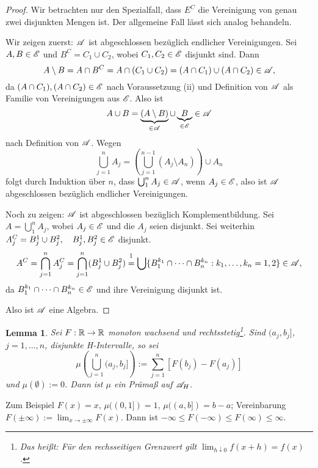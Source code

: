\documentclass[
 a4paper,
 12pt,
 parskip=half
 ]{scrreprt}
\theoremstyle{plain}
\newtheorem{lem}[thm]{Lemma}
\theoremstyle{definition}
\numberwithin{equation}{section}
\begin{document}
\begin{proof}
 Wir betrachten nur den Spezialfall, dass $E^C$ die Vereinigung von genau zwei disjunkten Mengen ist. Der allgemeine Fall lässt sich analog behandeln.
 
 Wir zeigen zuerst: $\mathscr{A}$ ist abgeschlossen bezüglich endlicher Vereinigungen. Sei $A,B \in \mathscr{E}$ und $B^C = C_1 \cup C_2$, wobei $C_1, C_2 \in \mathscr{E}$ disjunkt sind. Dann
 \[ A \setminus B = A \cap B^C = A \cap( C_1 \cup C_2 ) = (A \cap C_1) \cup (A \cap C_2) \in \mathscr{A}, \]
 da $(A \cap C_1), (A \cap C_2) \in \mathscr{E}$ nach Voraussetzung (ii) und Definition von $\mathscr{A}$ als Familie von Vereinigungen aus $\mathscr{E}$. Also ist
 \[ A \cup B = \underbrace{(A \setminus B)}_{\in \mathscr{A}} \cup \underbrace{B}_{\in \mathscr{E}} \in \mathscr{A} \]
 nach Definition von $\mathscr{A}$. Wegen
 \[ \bigcup_{j=1}^n A_j = \left( \bigcup_{j=1}^{n-1}( A_j \setminus A_n ) \right) \cup A_n \]
 folgt durch Induktion über $n$, dass $\bigcup_1^n A_j \in \mathscr{A}$, wenn $A_j \in \mathscr{E}$, also ist $\mathscr{A}$ abgeschlossen bezüglich endlicher Vereinigungen.
 
 Noch zu zeigen: $\mathscr{A}$ ist abgeschlossen bezüglich Komplementbildung. Sei $A = \bigcup_1^n A_j$, wobei $A_j \in \mathscr{E}$ und die $A_j$ seien disjunkt. Sei weiterhin $A_j^C = B_j^1 \cup B_j^2, \quad B_j^1, B_j^2 \in \mathscr{E}$ disjunkt.
 \[ A^C = \bigcap_{j=1}^n A_j^C = \bigcap_{j=1}^n (B_j^1 \cup B_j^2) \overset{\footnotemark}{=} \bigcup \{ B_1^{k_1} \cap \cdots \cap B_n^{k_n} : k_1, \ldots, k_n = 1,2 \} \in \mA, \]
 da $B_1^{k_1} \cap \cdots \cap B_n^{k_n} \in \mathscr{E}$ und ihre Vereinigung disjunkt ist.
 
 Also ist $\mathscr{A}$ eine Algebra.
\end{proof}

\begin{lem}
 Sei $F: \mathbb{R} \to \mathbb{R}$ monoton wachsend und rechtsstetig\footnote{Das heißt: Für den rechsseitigen Grenzwert gilt $\lim_{h \downarrow 0} f(x + h) = f(x)$.}. Sind $(a_j, b_j]$, $j= 1, \ldots, n$, disjunkte H-Intervalle, so sei
 \[ \mu \left( \bigcup_{j=1}^n (a_j, b_j] \right) := \sum_{j=1}^n [ F(b_j) - F(a_j) ] \]
 und $\mu( \emptyset ) := 0$. Dann ist $\mu$ ein Prämaß auf $\mathscr{A}_H$.
\end{lem} 

Zum Beispiel $F(x) = x$, $\mu( (0,1] ) = 1$, $\mu( (a,b] ) = b - a$; Vereinbarung $F( \pm \infty ) := \lim_{x \to \pm \infty} F(x)$. Dann ist $- \infty \le F(-\infty) \le F(\infty) \le \infty$.
\end{document}
